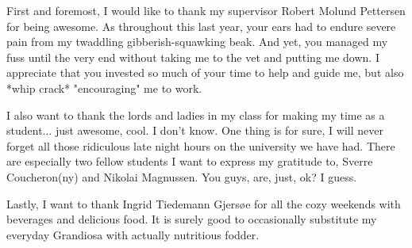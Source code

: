 \begin{acknowledgement}
First and foremost, I would like to thank my supervisor Robert Molund Pettersen for being awesome. As throughout this last year, your ears had to endure severe pain from my twaddling gibberish-squawking beak. And yet, you managed my fuss until the very end without taking me to the vet and putting me down. I appreciate that you invested so much of your time to help and guide me, but also *whip crack* "encouraging" me to work.

I also want to thank the lords and ladies in my class for making my time as a student... just awesome, cool. I don't know. One thing is for sure, I will never forget all those ridiculous late night hours on the university we have had. There are especially two fellow students I want to express my gratitude to, Sverre Coucheron(ny) and Nikolai Magnussen. You guys, are, just, ok? I guess.

Lastly, I want to thank Ingrid Tiedemann Gjersøe for all the cozy weekends with beverages and delicious food. It is surely good to occasionally substitute my everyday Grandiosa with actually nutritious fodder.
\end{acknowledgement}